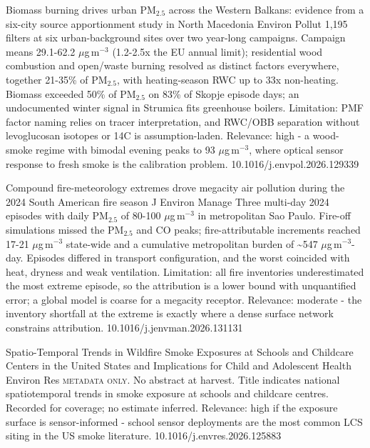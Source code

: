 \documentclass[10pt]{article}
\begin{document}
\par{}\baselineskip{}\baselineskip
{}

{Biomass burning drives urban PM$_{2.5}$ across the Western Balkans: evidence from a six-city source apportionment study in North Macedonia}
{Environ Pollut}
{1,195 filters at six urban-background sites over two year-long campaigns. Campaign means 29.1-62.2 $\mu$g\,m$^{-3}$ (1.2-2.5x the EU annual limit); residential wood combustion and open/waste burning resolved as distinct factors everywhere, together 21-35\% of PM$_{2.5}$, with heating-season RWC up to 33x non-heating. Biomass exceeded 50\% of PM$_{2.5}$ on 83\% of Skopje episode days; an undocumented winter signal in Strumica fits greenhouse boilers. Limitation: PMF factor naming relies on tracer interpretation, and RWC/OBB separation without levoglucosan isotopes or 14C is assumption-laden. Relevance: high - a wood-smoke regime with bimodal evening peaks to 93 $\mu$g\,m$^{-3}$, where optical sensor response to fresh smoke is the calibration problem.}
{10.1016/j.envpol.2026.129339}

{Compound fire-meteorology extremes drove megacity air pollution during the 2024 South American fire season}
{J Environ Manage}
{Three multi-day 2024 episodes with daily PM$_{2.5}$ of 80-100 $\mu$g\,m$^{-3}$ in metropolitan Sao Paulo. Fire-off simulations missed the PM$_{2.5}$ and CO peaks; fire-attributable increments reached 17-21 $\mu$g\,m$^{-3}$ state-wide and a cumulative metropolitan burden of \textasciitilde{}547 $\mu$g\,m$^{-3}$-day. Episodes differed in transport configuration, and the worst coincided with heat, dryness and weak ventilation. Limitation: all fire inventories underestimated the most extreme episode, so the attribution is a lower bound with unquantified error; a global model is coarse for a megacity receptor. Relevance: moderate - the inventory shortfall at the extreme is exactly where a dense surface network constrains attribution.}
{10.1016/j.jenvman.2026.131131}

{Spatio-Temporal Trends in Wildfire Smoke Exposures at Schools and Childcare Centers in the United States and Implications for Child and Adolescent Health}
{Environ Res}
{\textsc{metadata only.} No abstract at harvest. Title indicates national spatiotemporal trends in smoke exposure at schools and childcare centres. Recorded for coverage; no estimate inferred. Relevance: high if the exposure surface is sensor-informed - school sensor deployments are the most common LCS siting in the US smoke literature.}
{10.1016/j.envres.2026.125883}
\end{document}
